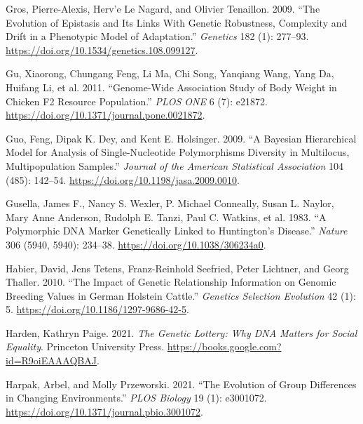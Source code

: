 \documentclass[
]{book}
\newlength{\cslhangindent}
\newlength{\cslentryspacingunit} %
\newenvironment{CSLReferences}[2] %
 {%
  \setlength{\parindent}{0pt}
  \ifodd #1
  \let\oldpar\par
  \def\par{\hangindent=\cslhangindent\oldpar}
  \fi
  \setlength{\parskip}{#2\cslentryspacingunit}
 }%
 {}
\begin{document}
\begin{CSLReferences}{1}{0}
\leavevmode{}%
Gros, Pierre-Alexis, Herv'e Le Nagard, and Olivier Tenaillon. 2009. {``The {Evolution} of {Epistasis} and {Its Links With Genetic Robustness}, {Complexity} and {Drift} in a {Phenotypic Model} of {Adaptation}.''} \emph{Genetics} 182 (1): 277--93. \url{https://doi.org/10.1534/genetics.108.099127}.

\leavevmode{}%
Gu, Xiaorong, Chungang Feng, Li Ma, Chi Song, Yanqiang Wang, Yang Da, Huifang Li, et al. 2011. {``Genome-{Wide Association Study} of {Body Weight} in {Chicken F2 Resource Population}.''} \emph{PLOS ONE} 6 (7): e21872. \url{https://doi.org/10.1371/journal.pone.0021872}.

\leavevmode{}%
Guo, Feng, Dipak K. Dey, and Kent E. Holsinger. 2009. {``A {Bayesian Hierarchical Model} for {Analysis} of {Single-Nucleotide Polymorphisms Diversity} in {Multilocus}, {Multipopulation Samples}.''} \emph{Journal of the American Statistical Association} 104 (485): 142--54. \url{https://doi.org/10.1198/jasa.2009.0010}.

\leavevmode{}%
Gusella, James F., Nancy S. Wexler, P. Michael Conneally, Susan L. Naylor, Mary Anne Anderson, Rudolph E. Tanzi, Paul C. Watkins, et al. 1983. {``A Polymorphic {DNA} Marker Genetically Linked to {Huntington}'s Disease.''} \emph{Nature} 306 (5940, 5940): 234--38. \url{https://doi.org/10.1038/306234a0}.

\leavevmode{}%
Habier, David, Jens Tetens, Franz-Reinhold Seefried, Peter Lichtner, and Georg Thaller. 2010. {``The Impact of Genetic Relationship Information on Genomic Breeding Values in {German Holstein} Cattle.''} \emph{Genetics Selection Evolution} 42 (1): 5. \url{https://doi.org/10.1186/1297-9686-42-5}.

\leavevmode{}%
Harden, Kathryn Paige. 2021. \emph{The {Genetic Lottery}: {Why DNA Matters} for {Social Equality}}. {Princeton University Press}. \url{https://books.google.com?id=R9oiEAAAQBAJ}.

\leavevmode{}%
Harpak, Arbel, and Molly Przeworski. 2021. {``The Evolution of Group Differences in Changing Environments.''} \emph{PLOS Biology} 19 (1): e3001072. \url{https://doi.org/10.1371/journal.pbio.3001072}.


\end{CSLReferences}
\end{document}
